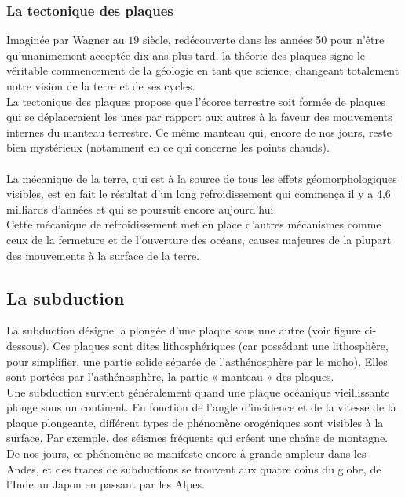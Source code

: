 \documentclass[a4paper,11pt]{article}
\begin{document}
\subsubsection{La tectonique des plaques}

Imaginée par Wagner au $19$ siècle, redécouverte dans les années 50 pour n'être qu'unanimement acceptée dix ans plus tard, la théorie des plaques signe le véritable commencement de la géologie en tant que science, changeant totalement notre vision de la terre et de ses cycles. \\
La tectonique des plaques propose que l'écorce terrestre soit formée de plaques qui se déplaceraient les unes par rapport aux autres à la faveur des mouvements internes du manteau terrestre. Ce même manteau qui, encore de nos jours, reste bien mystérieux (notamment en ce qui concerne les points chauds). \\
\\
La mécanique de la terre, qui est à la source de tous les effets géomorphologiques visibles, est en fait le résultat d'un long refroidissement qui commença il y a 4,6 milliards d'années et qui se poursuit encore aujourd'hui.\\
Cette mécanique de refroidissement met en place d'autres mécanismes comme ceux de la fermeture et de l'ouverture des océans, causes majeures de la plupart des mouvements à la surface de la terre.

\subsection{La subduction}

La subduction désigne la plongée d'une plaque sous une autre (voir figure ci-dessous). Ces plaques sont dites lithosphériques (car possédant une lithosphère, pour simplifier, une partie solide séparée de l'asthénosphère par le moho). Elles sont portées par l'asthénosphère, la partie « manteau » des plaques. \\
Une subduction survient généralement quand une plaque océanique vieillissante plonge sous un continent. En fonction de l'angle d'incidence et de la vitesse de la plaque plongeante, différent types de phénomène orogéniques sont visibles à la surface. Par exemple, des séismes fréquents qui créent une chaîne de montagne. \\
De nos jours, ce phénomène se manifeste encore à grande ampleur dans les Andes, et des traces de subductions se trouvent aux quatre coins du globe, de l'Inde au Japon en passant par les Alpes. \\
\end{document}
